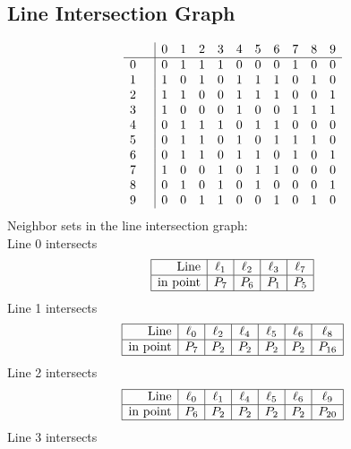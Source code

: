 \documentclass{article}
\begin{document}
{\subsection*{Line Intersection Graph}
{\arraycolsep=1pt
$$
\begin{array}{rr|*{10}r}
 &  & 0 & 1 & 2 & 3 & 4 & 5 & 6 & 7 & 8 & 9\\
\hline
0 &  & 0 & 1 & 1 & 1 & 0 & 0 & 0 & 1 & 0 & 0\\
1 &  & 1 & 0 & 1 & 0 & 1 & 1 & 1 & 0 & 1 & 0\\
2 &  & 1 & 1 & 0 & 0 & 1 & 1 & 1 & 0 & 0 & 1\\
3 &  & 1 & 0 & 0 & 0 & 1 & 0 & 0 & 1 & 1 & 1\\
4 &  & 0 & 1 & 1 & 1 & 0 & 1 & 1 & 0 & 0 & 0\\
5 &  & 0 & 1 & 1 & 0 & 1 & 0 & 1 & 1 & 1 & 0\\
6 &  & 0 & 1 & 1 & 0 & 1 & 1 & 0 & 1 & 0 & 1\\
7 &  & 1 & 0 & 0 & 1 & 0 & 1 & 1 & 0 & 0 & 0\\
8 &  & 0 & 1 & 0 & 1 & 0 & 1 & 0 & 0 & 0 & 1\\
9 &  & 0 & 0 & 1 & 1 & 0 & 0 & 1 & 0 & 1 & 0\\
\end{array}
$$
}%
Neighbor sets in the line intersection graph:\\
Line 0 intersects 
$$
\begin{array}{|r*{4}{|c}|}
\hline
\mbox{Line}  & \ell_{1} & \ell_{2} & \ell_{3} & \ell_{7}\\
\hline
\mbox{in point}  & P_{7} & P_{6} & P_{1} & P_{5}\\
\hline
\end{array}
$$
Line 1 intersects 
$$
\begin{array}{|r*{6}{|c}|}
\hline
\mbox{Line}  & \ell_{0} & \ell_{2} & \ell_{4} & \ell_{5} & \ell_{6} & \ell_{8}\\
\hline
\mbox{in point}  & P_{7} & P_{2} & P_{2} & P_{2} & P_{2} & P_{16}\\
\hline
\end{array}
$$
Line 2 intersects 
$$
\begin{array}{|r*{6}{|c}|}
\hline
\mbox{Line}  & \ell_{0} & \ell_{1} & \ell_{4} & \ell_{5} & \ell_{6} & \ell_{9}\\
\hline
\mbox{in point}  & P_{6} & P_{2} & P_{2} & P_{2} & P_{2} & P_{20}\\
\hline
\end{array}
$$
Line 3 intersects 
$$
\begin{array}{|r*{5}{|c}|}

\end{array}$$}
\end{document}
